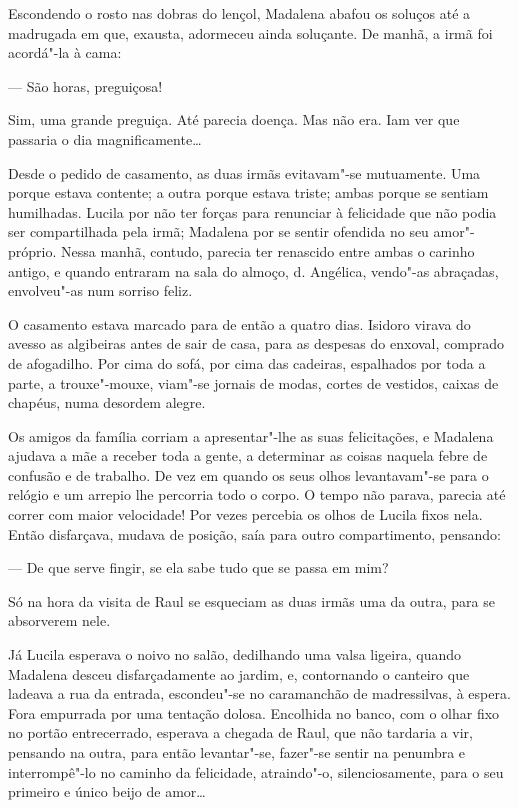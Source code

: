 Escondendo o rosto nas dobras do lençol, Madalena abafou os soluços até
a madrugada em que, exausta, adormeceu ainda soluçante. De manhã, a irmã
foi acordá"-la à cama:

--- São horas, preguiçosa!

Sim, uma grande preguiça. Até parecia doença. Mas não era. Iam ver que
passaria o dia magnificamente\ldots{}

Desde o pedido de casamento, as duas irmãs evitavam"-se mutuamente. Uma
porque estava contente; a outra porque estava triste; ambas porque se
sentiam humilhadas. Lucila por não ter forças para renunciar à
felicidade que não podia ser compartilhada pela irmã; Madalena por se
sentir ofendida no seu amor"-próprio. Nessa manhã, contudo, parecia ter
renascido entre ambas o carinho antigo, e quando entraram na sala do
almoço, d. Angélica, vendo"-as abraçadas, envolveu"-as num sorriso feliz.

O casamento estava marcado para de então a quatro dias. Isidoro virava
do avesso as algibeiras antes de sair de casa, para as despesas do
enxoval, comprado de afogadilho. Por cima do sofá, por cima das
cadeiras, espalhados por toda a parte, a trouxe"-mouxe, viam"-se jornais
de modas, cortes de vestidos, caixas de chapéus, numa desordem alegre.

Os amigos da família corriam a apresentar"-lhe as suas felicitações, e
Madalena ajudava a mãe a receber toda a gente, a determinar as coisas
naquela febre de confusão e de trabalho. De vez em quando os seus olhos
levantavam"-se para o relógio e um arrepio lhe percorria todo o corpo. O
tempo não parava, parecia até correr com maior velocidade! Por vezes
percebia os olhos de Lucila fixos nela. Então disfarçava, mudava de
posição, saía para outro compartimento, pensando:

--- De que serve fingir, se ela sabe tudo que se passa em mim?

Só na hora da visita de Raul se esqueciam as duas irmãs uma da outra,
para se absorverem nele.

\asterisc

Já Lucila esperava o noivo no salão, dedilhando uma valsa ligeira,
quando Madalena desceu disfarçadamente ao jardim, e, contornando o
canteiro que ladeava a rua da entrada, escondeu"-se no caramanchão de
madressilvas, à espera. Fora empurrada por uma tentação dolosa.
Encolhida no banco, com o olhar fixo no portão entrecerrado, esperava a
chegada de Raul, que não tardaria a vir, pensando na outra, para então
levantar"-se, fazer"-se sentir na penumbra e interrompê"-lo no caminho da
felicidade, atraindo"-o, silenciosamente, para o seu primeiro e único
beijo de amor\ldots{}

